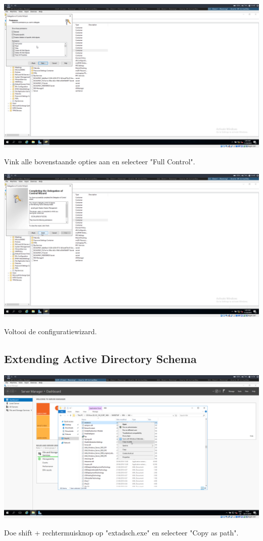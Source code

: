 \documentclass[a4paper]{article}
\begin{document}
\begin{center}
	\includegraphics[width=15cm]{Pictures/SCCM/1/1543499353.png}
	
		Vink alle bovenstaande opties aan en selecteer "Full Control".

\end{center}
\begin{center}
	\includegraphics[width=15cm]{Pictures/SCCM/1/1543499355.png}
	
		Voltooi de configuratiewizard.
\end{center}
\subsection{Extending Active Directory Schema}
\begin{center}
	\includegraphics[width=15cm]{Pictures/SCCM/2/1543499664.png}
	
	Doe shift + rechtermuisknop op "extadsch.exe" en selecteer "Copy as path".
\end{center}
\end{document}
